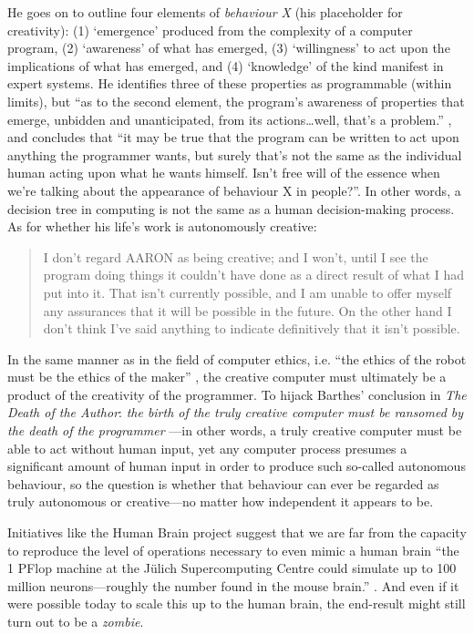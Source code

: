 He goes on to outline four elements of \emph{behaviour X} (his placeholder for creativity): (1) `emergence' produced from the complexity of a computer program, (2) `awareness' of what has emerged, (3) `willingness' to act upon the implications of what has emerged, and (4) `knowledge' of the kind manifest in expert systems. He identifies three of these properties as programmable (within limits), but ``as to the second element, the program\rq s awareness of properties that emerge, unbidden and unanticipated, from its actions\ldots  well, that\rq s a problem.'' \autocite{Cohen1999}, and concludes that ``it may be true that the program can be written to act upon anything the programmer wants, but surely that\rq s not the same as the individual human acting upon what he wants himself. Isn\rq t free will of the essence when we\rq re talking about the appearance of behaviour X in people?''. In other words, a decision tree in computing is not the same as a human decision-making process. As for whether his life's work is autonomously creative:

\begin{quotation}
  I don't regard AARON as being creative; and I won't, until I see the program doing things it couldn't have done as a direct result of what I had put into it. That isn't currently possible, and I am unable to offer myself any assurances that it will be possible in the future. On the other hand I don't think I've said anything to indicate definitively that it isn't possible. 
\end{quotation}

In the same manner as in the field of computer ethics, i.e. ``the ethics of the robot must be the ethics of the maker'' \autocite{Mcbride2012}, the creative computer must ultimately be a product of the creativity of the programmer. To hijack Barthes' conclusion in \textit{The Death of the Author}: \emph{the birth of the truly creative computer must be ransomed by the death of the programmer} \autocite{Barthes1967}---in other words, a truly creative computer must be able to act without human input, yet any computer process presumes a significant amount of human input in order to produce such so-called autonomous behaviour, so the question is whether that behaviour can ever be regarded as truly autonomous or creative---no matter how independent it appears to be.

Initiatives like the Human Brain project suggest that we are far from the capacity to reproduce the level of operations necessary to even mimic a human brain ``the \num{1} PFlop machine at the J{\"u}lich Supercomputing Centre could simulate up to \num{100} million neurons---roughly the number found in the mouse brain.'' \autocite{Walker2012}. And even if it were possible today to scale this up to the human brain, the end-result might still turn out to be a \emph{zombie}.

